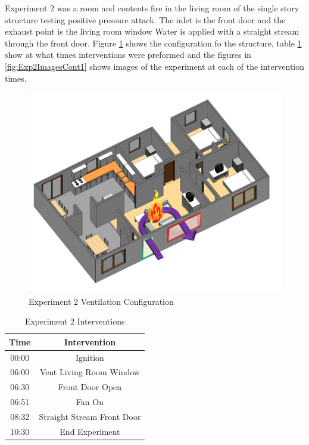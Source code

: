 \documentclass{article}
\begin{document}
Experiment 2 was a room and contents fire in the living room of the single story structure testing positive pressure attack. The inlet is the front door and the exhaust point is the living room window Water is applied with a straight stream through the front door. Figure \ref{fig:Exp2VentConfig} shows the configuration fo the structure, table \ref{Table:Exp2Interventions} show at what times interventions were preformed and the figures in \ref{fig:Exp2ImagesCont1} shows images of the experiment at each of the intervention times.

 \begin{figure}[h!]
 	\centering
 	\includegraphics[width=5in]{0_Images/FireExperiments/Single_Story/Experiment_2.jpg}
 	\caption{Experiment 2 Ventilation Configuration}
 	\label{fig:Exp2VentConfig}
 \end{figure}

\begin{table}[H]
	\centering
	\caption{Experiment 2 Interventions}
	\begin{tabular}{|c|c|} 
		\hline
		Time & Intervention \\ \hline \hline
		00:00 & Ignition \\ \hline
		06:00 & Vent Living Room Window\\ \hline
		06:30 & Front Door Open \\ \hline
		06:51 & Fan On \\ \hline
		08:32 & Straight Stream Front Door \\ \hline
		10:30 & End Experiment \\ \hline
	\end{tabular}
	\label{Table:Exp2Interventions}
\end{table}
\end{document}
